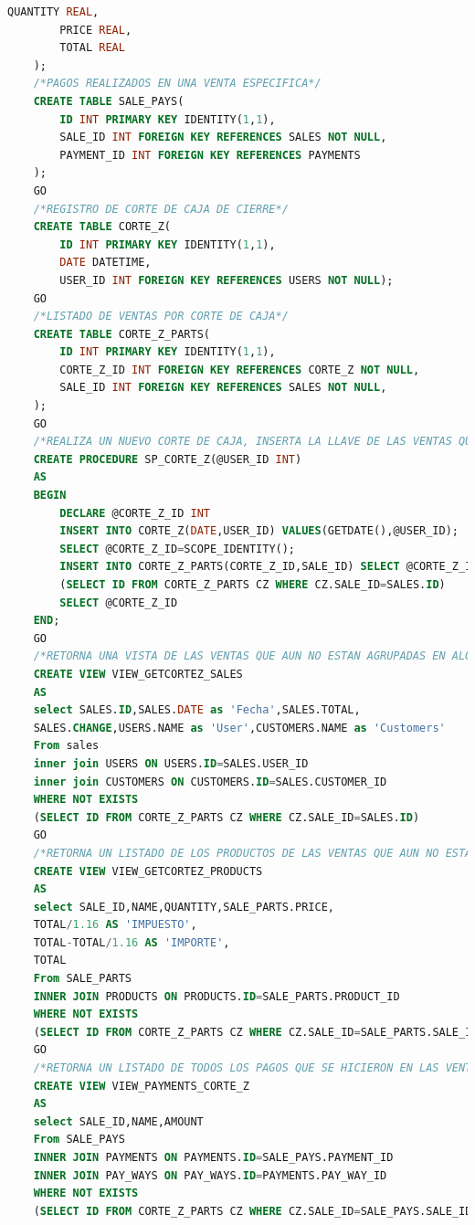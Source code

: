 \documentclass[a4paper,DIV=12]{scrreprt}
\begin{document}
\begin{lstlisting}[language={SQL}]
        QUANTITY REAL,
        PRICE REAL,
        TOTAL REAL
    );
    /*PAGOS REALIZADOS EN UNA VENTA ESPECIFICA*/
    CREATE TABLE SALE_PAYS(
        ID INT PRIMARY KEY IDENTITY(1,1),
        SALE_ID INT FOREIGN KEY REFERENCES SALES NOT NULL,
        PAYMENT_ID INT FOREIGN KEY REFERENCES PAYMENTS
    );
    GO
    /*REGISTRO DE CORTE DE CAJA DE CIERRE*/
    CREATE TABLE CORTE_Z(
        ID INT PRIMARY KEY IDENTITY(1,1),
        DATE DATETIME,
        USER_ID INT FOREIGN KEY REFERENCES USERS NOT NULL);
    GO
    /*LISTADO DE VENTAS POR CORTE DE CAJA*/
    CREATE TABLE CORTE_Z_PARTS(
        ID INT PRIMARY KEY IDENTITY(1,1),
        CORTE_Z_ID INT FOREIGN KEY REFERENCES CORTE_Z NOT NULL,
        SALE_ID INT FOREIGN KEY REFERENCES SALES NOT NULL,
    );
    GO
    /*REALIZA UN NUEVO CORTE DE CAJA, INSERTA LA LLAVE DE LAS VENTAS QUE PARTICIPAN EN ESTE CORTE*/
    CREATE PROCEDURE SP_CORTE_Z(@USER_ID INT)
    AS
    BEGIN
        DECLARE @CORTE_Z_ID INT
        INSERT INTO CORTE_Z(DATE,USER_ID) VALUES(GETDATE(),@USER_ID);
        SELECT @CORTE_Z_ID=SCOPE_IDENTITY();
        INSERT INTO CORTE_Z_PARTS(CORTE_Z_ID,SALE_ID) SELECT @CORTE_Z_ID,ID FROM SALES WHERE NOT EXISTS 
        (SELECT ID FROM CORTE_Z_PARTS CZ WHERE CZ.SALE_ID=SALES.ID)
        SELECT @CORTE_Z_ID
    END;
    GO
    /*RETORNA UNA VISTA DE LAS VENTAS QUE AUN NO ESTAN AGRUPADAS EN ALGUN CORTE DE CAJA*/
    CREATE VIEW VIEW_GETCORTEZ_SALES
    AS
    select SALES.ID,SALES.DATE as 'Fecha',SALES.TOTAL,
    SALES.CHANGE,USERS.NAME as 'User',CUSTOMERS.NAME as 'Customers' 
    From sales
    inner join USERS ON USERS.ID=SALES.USER_ID
    inner join CUSTOMERS ON CUSTOMERS.ID=SALES.CUSTOMER_ID
    WHERE NOT EXISTS 
    (SELECT ID FROM CORTE_Z_PARTS CZ WHERE CZ.SALE_ID=SALES.ID)
    GO
    /*RETORNA UN LISTADO DE LOS PRODUCTOS DE LAS VENTAS QUE AUN NO ESTAN AGRUPADAS EN ALGUN CORTE DE CAJA*/
    CREATE VIEW VIEW_GETCORTEZ_PRODUCTS
    AS
    select SALE_ID,NAME,QUANTITY,SALE_PARTS.PRICE,
    TOTAL/1.16 AS 'IMPUESTO',
    TOTAL-TOTAL/1.16 AS 'IMPORTE',
    TOTAL
    From SALE_PARTS
    INNER JOIN PRODUCTS ON PRODUCTS.ID=SALE_PARTS.PRODUCT_ID
    WHERE NOT EXISTS 
    (SELECT ID FROM CORTE_Z_PARTS CZ WHERE CZ.SALE_ID=SALE_PARTS.SALE_ID)
    GO
    /*RETORNA UN LISTADO DE TODOS LOS PAGOS QUE SE HICIERON EN LAS VENTAS QUE AUN NO ESTAN AGRUPADAS EN ALGUN CORTE DE CAJA*/
    CREATE VIEW VIEW_PAYMENTS_CORTE_Z
    AS
    select SALE_ID,NAME,AMOUNT
    From SALE_PAYS
    INNER JOIN PAYMENTS ON PAYMENTS.ID=SALE_PAYS.PAYMENT_ID
    INNER JOIN PAY_WAYS ON PAY_WAYS.ID=PAYMENTS.PAY_WAY_ID
    WHERE NOT EXISTS 
    (SELECT ID FROM CORTE_Z_PARTS CZ WHERE CZ.SALE_ID=SALE_PAYS.SALE_ID)

\end{lstlisting}
\end{document}
